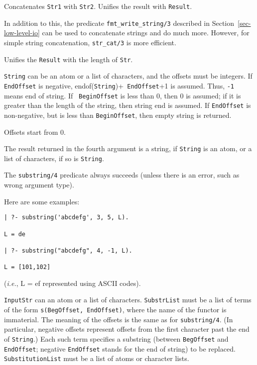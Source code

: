 \begin{description}
        
Concatenates {\tt Str1} with {\tt Str2}. Unifies the result with {\tt Result}.

In addition to this, the predicate \verb|fmt_write_string/3| described in
Section~\ref{sec-low-level-io} can be used to concatenate strings and do
much more. However, for simple string concatenation, {\tt str\_cat/3} is
more efficient.


Unifies the {\tt Result}  with the length of {\tt Str}.

{\tt String} can be an atom or a list of characters, and the offsets must
be integers.  If {\tt EndOffset} is negative, endof({\tt String})+{\tt
  EndOffset}+1 is assumed. Thus, {\tt -1} means end of string.  If {\tt
  BeginOffset} is less than 0, then 0 is assumed; if it is greater than the
length of the string, then string end is assumed. If {\tt EndOffset} is
non-negative, but is less than {\tt BeginOffset}, then empty string is
returned.

Offsets start from 0.

The result returned in the fourth argument is a string, if {\tt String} is
an atom, or a list of characters, if so is {\tt String}.

The \verb|substring/4| predicate always succeeds (unless there is an error,
such as wrong argument type).

Here are some examples: 
\begin{verbatim}
| ?- substring('abcdefg', 3, 5, L).

L = de

| ?- substring("abcdefg", 4, -1, L).

L = [101,102]
\end{verbatim}
({\it i.e.}, L = ef represented using ASCII codes).


{\tt InputStr} can an atom or a list of characters.  {\tt SubstrList} must
be a list of terms of the form {\tt s(BegOffset, EndOffset)}, where the
name of the functor is immaterial.  The meaning of the offsets is the same
as for {\tt substring/4}. (In particular, negative offsets represent
offsets from the first character past the end of {\tt String}.)  Each such
term specifies a substring (between {\tt BegOffset} and {\tt EndOffset};
negative {\tt EndOffset} stands for the end of string) to be replaced.
{\tt SubstitutionList} must be a list of atoms or character lists.


\end{description}
